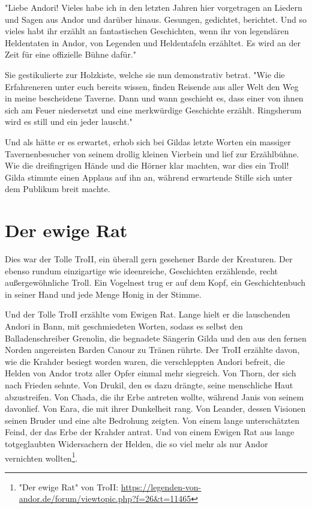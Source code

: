"Liebe Andori! Vieles habe ich in den letzten Jahren hier vorgetragen an Liedern und Sagen aus Andor und darüber hinaus. Gesungen, gedichtet, berichtet. Und so vieles habt ihr erzählt an fantastischen Geschichten, wenn ihr von legendären Heldentaten in Andor, von Legenden und Heldentafeln erzähltet. Es wird an der Zeit für eine offizielle Bühne dafür."

Sie gestikulierte zur Holzkiste, welche sie nun demonstrativ betrat. "Wie die Erfahreneren unter euch bereits wissen, finden Reisende aus aller Welt den Weg in meine bescheidene Taverne. Dann und wann geschieht es, dass einer von ihnen sich am Feuer niedersetzt und eine merkwürdige Geschichte erzählt. Ringsherum wird es still und ein jeder lauscht."

Und als hätte er es erwartet, erhob sich bei Gildas letzte Worten ein massiger Tavernenbesucher von seinem drollig kleinen Vierbein und lief zur Erzählbühne. Wie die dreifingrigen Hände und die Hörner klar machten, war dies ein Troll! Gilda stimmte einen Applaus auf ihn an, während erwartende Stille sich unter dem Publikum breit machte.




\section{Der ewige Rat}

Dies war der Tolle TroII, ein überall gern gesehener Barde der Kreaturen. Der ebenso rundum einzigartige wie ideenreiche, Geschichten erzählende, recht außergewöhnliche Troll. Ein Vogelnest trug er auf dem Kopf, ein Geschichtenbuch in seiner Hand und jede Menge Honig in der Stimme.

Und der Tolle TroII erzählte vom Ewigen Rat. Lange hielt er die lauschenden Andori in Bann, mit geschmiedeten Worten, sodass es selbst den Balladenschreiber Grenolin, die begnadete Sängerin Gilda und den aus den fernen Norden angereisten Barden Canour zu Tränen rührte. Der TroII erzählte davon, wie die Krahder besiegt worden waren, die verschleppten Andori befreit, die Helden von Andor trotz aller Opfer einmal mehr siegreich. Von Thorn, der sich nach Frieden sehnte. Von Drukil, den es dazu drängte, seine menschliche Haut abzustreifen. Von Chada, die ihr Erbe antreten  wollte, während Janis von seinem davonlief. Von Eara, die mit ihrer Dunkelheit rang. Von Leander, dessen Visionen seinen Bruder und eine alte Bedrohung zeigten. Von einem lange unterschätzten Feind, der das Erbe der Krahder antrat. Und von einem Ewigen Rat aus lange totgeglaubten Widersachern der Helden, die so viel mehr als nur Andor vernichten wollten\footnote{"Der ewige Rat" von TroII: \url{https://legenden-von-andor.de/forum/viewtopic.php?f=26&t=11465}}.

